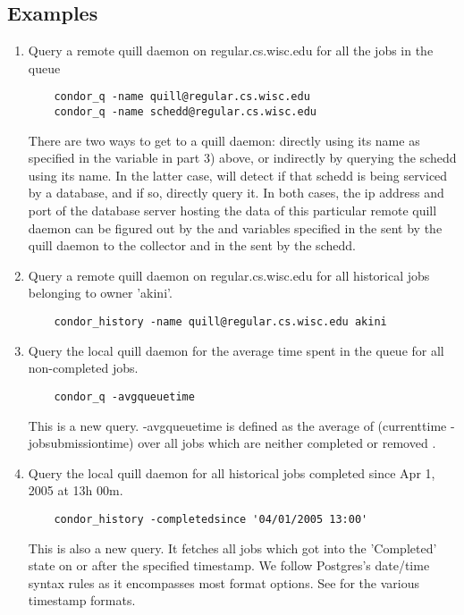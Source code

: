\subsection{\label{sec:Quill-Example}Examples}


\begin{enumerate}
\item Query a remote quill daemon on regular.cs.wisc.edu for all the jobs in 
the queue
\begin{verbatim}
	condor_q -name quill@regular.cs.wisc.edu
	condor_q -name schedd@regular.cs.wisc.edu

\end{verbatim}
There are two ways to get to a quill daemon: directly using its name as 
specified in the  variable in part 3) above, or indirectly
by querying the schedd using its name.  In the latter case,  will detect 
if that schedd is being serviced by a database, and if so, directly query it.
In both cases, the ip address and port of the database server hosting the data of 
this particular remote quill daemon can be figured out by the  
and  variables specified in the 
sent by the quill daemon to the collector and in the  sent by
the schedd.  

\item Query a remote quill daemon on regular.cs.wisc.edu for all historical 
jobs belonging to owner 'akini'.
\begin{verbatim}
	condor_history -name quill@regular.cs.wisc.edu akini
\end{verbatim}

\item Query the local quill daemon for the average time spent in the queue 
for all non-completed jobs. 
\begin{verbatim}
	condor_q -avgqueuetime 
\end{verbatim}
This is a new query.  -avgqueuetime is defined as the average of
(currenttime - jobsubmissiontime) over all jobs which are neither
completed  or removed .

\item Query the local quill daemon for all historical jobs completed since 
Apr 1, 2005 at 13h 00m.
\begin{verbatim}
	condor_history -completedsince '04/01/2005 13:00'
\end{verbatim}
This is also a new query.  It fetches all jobs
which got into the 'Completed' state on or after the
specified timestamp.  We follow Postgres's date/time
syntax rules as it encompasses most format options.  See
for the various timestamp formats.

\end{enumerate}

